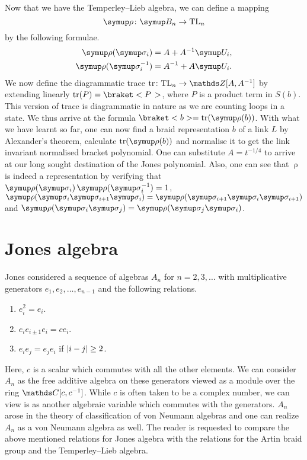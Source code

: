 Now that we have the Temperley--Lieb algebra, we can define a mapping \[\uprho \colon \B_n \rightarrow \TL_n\] by the following formulae.
\begin{align*}
	\uprho (\sigmaa_i) &= A + A^{-1}\U_i,\\
	\uprho (\sigmaa_i^{-1}) &= A^{-1} + A\U_i.
\end{align*}
We now define the diagrammatic trace \(\tr \colon \TL_n \rightarrow \Z[A, A^{-1}]\) by extending linearly \(\tr(P) = \braket<P\,>\), where \(P\) is a product term in \(S(b)\). This version of trace is diagrammatic in nature as we are counting loops in a state. We thus arrive at the formula \(\braket<b> = \tr(\operatorname{\uprho}(b))\). With what we have learnt so far, one can now find a braid representation \(b\) of a link \(L\) by Alexander's theorem, calculate \(\tr(\operatorname{\uprho}(b))\) and normalise it to get the link invariant normalised bracket polynomial. One can substitute \(A = t^{-1/4}\) to arrive at our long sought destination of the Jones polynomial. Also, one can see that \(\uprho\) is indeed a representation by verifying that \(\uprhoo(\sigmaa_i)\uprhoo(\sigmaa_i^{-1}) = 1\), \(\uprhoo(\sigmaa_i \sigmaa_{i+1} \sigmaa_i) = \uprhoo(\sigmaa_{i+1} \sigmaa_i \sigmaa_{i+1})\) and \(\uprhoo(\sigmaa_i\sigmaa_j) = \uprhoo(\sigmaa_j\sigmaa_i)\).

\section{Jones algebra}

Jones considered a sequence of algebras \(A_n\) for \(n = 2,3,\ldots\) with multiplicative generators \(e_1, e_2,\ldots, e_{n-1}\) and the following relations.
\begin{enumerate}
    \item \(e_i^2 = e_i\).
	\item \(e_ie_{i\pm 1} e_i = ce_i\).
	\item \(e_ie_j = e_je_i\) if \(\lvert i-j\rvert \geq 2\).
\end{enumerate}
Here, \(c\) is a scalar which commutes with all the other elements. We can consider \(A_n\) as the free additive algebra on these generators viewed as a module over the ring \(\symbb{C}[c,c^{-1}]\). While \(c\) is often taken to be a complex number, we can view is as another algebraic variable which commutes with the generators. \(A_n\) arose in the theory of classification of von Neumann algebras and one can realize \(A_n\) as a von Neumann algebra as well. The reader is requested to compare the above mentioned relations for Jones algebra with the relations for the Artin braid group and the Temperley--Lieb algebra.

